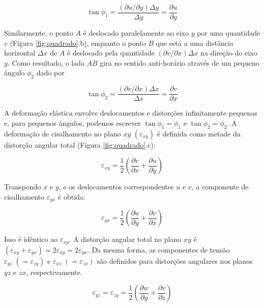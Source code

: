 \documentclass[]{book}
\theoremstyle{definition}
\theoremstyle{definition}
\theoremstyle{definition}
\theoremstyle{remark}
\begin{document}
\begin{equation}
\tan{\phi_{1}} = \frac {(\partial u/\partial y) \Delta{y}}{\Delta {y}}= \frac{\partial u}{\partial y} \label{eq:0309}
\end{equation}

Similarmente, o ponto \(A\) é deslocado paralelamente ao eixo \(y\) por uma quantidade \(v\) (Figura \ref{fig:quadrado}.b), enquanto o ponto \(B\) que está a uma distância horizontal \(\Delta x\) de \(A\) é deslocado pela quantidade \((\partial v / \partial x)\Delta x\) na direção do eixo \(y\). Como resultado, o lado \(AB\) gira no sentido anti-horário através de um pequeno ângulo \(\phi_2\) dado por

\begin{equation}
\tan{\phi_{2}}= \frac {(\partial v/\partial x) \Delta{x}}{\Delta {x}}= \frac {\partial v}{\partial x}\label{eq:0310}
\end{equation}

A deformação elástica envolve deslocamentos e distorções infinitamente pequenas e, para pequenos ângulos, podemos escrever \(\tan{\phi_ {1}} = {\phi_{1}}\) e \(\tan{\phi_{2}} = {\phi_{2}}\). A deformação de cisalhamento no plano \(xy\) \((\varepsilon_{xy})\) é definida como metade da distorção angular total (Figura \ref{fig:quadrado}.c):

\begin{equation}
\varepsilon_{xy}= \frac{1}{2} \left(\frac{\partial v}{\partial x} + \frac {\partial u}{\partial y}\right) \label{eq:0311}
\end{equation}

Transpondo \(x\) e \(y\), e os deslocamentos correspondentes \(u\) e \(v\), a componente de cisalhamento \(\varepsilon_{yx}\) é obtida:

\begin{equation}
\varepsilon_{yx}= \frac{1}{2} \left(\frac{\partial u}{\partial y} + \frac {\partial v}{\partial x}\right) \label{eq:0312}
\end {equation}

Isso é idêntico ao \(\varepsilon_{xy}\). A distorção angular total no plano \(xy\) é \((\varepsilon_{xy} + \varepsilon_{yx})= 2\varepsilon_ {xy}=2 \varepsilon_{yx}\). Da mesma forma, as componentes de tensão \(\varepsilon_{yz}\;(=\varepsilon_{zy})\) e \(\varepsilon_{xz}\;(= \varepsilon_{zx})\) são definidos para distorções angulares nos planos \(yz\) e \(zx\), respectivamente.

\begin{equation*}
\varepsilon_{yz}= \varepsilon_{zy} = \frac{1}{2}\left(\frac{\partial w}{\partial y} + \frac{\partial v}{\partial z}\right)
\end{equation*}
\end{document}
